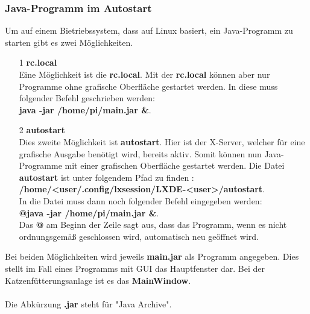\subsubsection{Java-Programm im Autostart}\label{subsubsec:Autostart}
Um auf einem Bietriebssystem, dass auf Linux basiert, ein Java-Programm zu starten gibt es zwei Möglichkeiten.
\begin{itemize}
\item[1] \textbf{rc.local}
\\ Eine Möglichkeit ist die \textbf{rc.local}. Mit der \textbf{rc.local} können aber nur Programme ohne grafische Oberfläche gestartet werden. In diese muss folgender Befehl geschrieben werden: 
\\ \textbf{java -jar /home/pi/main.jar \&}.
\item[2] \textbf{autostart}
\\ Dies zweite Möglichkeit ist \textbf{autostart}. Hier ist der X-Server, welcher für eine grafische Ausgabe benötigt wird, bereits aktiv. Somit können nun Java-Programme mit einer grafischen Oberfläche gestartet werden. Die Datei \textbf{autostart} ist unter folgendem Pfad zu finden : 
\\ \textbf{/home/<user/.config/lxsession/LXDE-<user>/autostart}. 
\\ In die Datei muss dann noch folgender Befehl eingegeben werden: 
\\ \textbf{@java -jar /home/pi/main.jar \&}.
\\Das \textbf{@} am Beginn der Zeile sagt aus, dass das Programm, wenn es nicht ordnungsgemäß geschlossen wird, automatisch neu geöffnet wird.
\end{itemize} 
Bei beiden Möglichkeiten wird jeweils \textbf{main.jar} als Programm angegeben. Dies stellt im Fall eines Programms mit GUI das Hauptfenster dar. Bei der Katzenfütterungsanlage ist es das \textbf{MainWindow}.
\\ \\ Die Abkürzung \textbf{.jar} steht für "Java Archive".

\newpage

